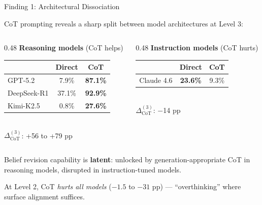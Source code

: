 \documentclass[aspectratio=169]{beamer}
\begin{document}
\begin{frame}{Finding 1: Architectural Dissociation}

\small
CoT prompting reveals a sharp split between model architectures at Level 3:

\vspace{0.3em}
\begin{columns}[T]
\begin{column}{0.48\textwidth}
\textbf{\textcolor{defabgreen}{Reasoning models}} (CoT helps)\\[3pt]
\footnotesize
\begin{tabular}{@{}lcc@{}}
\toprule
& Direct & CoT \\
\midrule
GPT-5.2 & 7.9\% & \textbf{87.1\%} \\
DeepSeek-R1 & 37.1\% & \textbf{92.9\%} \\
Kimi-K2.5 & 0.8\% & \textbf{27.6\%} \\
\bottomrule
\end{tabular}\\[4pt]
\small $\Delta_{\mathrm{CoT}}^{(3)}$: +56 to +79 pp
\end{column}

\begin{column}{0.48\textwidth}
\textbf{\textcolor{defabredish}{Instruction models}} (CoT hurts)\\[3pt]
\footnotesize
\begin{tabular}{@{}lcc@{}}
\toprule
& Direct & CoT \\
\midrule
Claude 4.6 & \textbf{23.6\%} & 9.3\% \\
\bottomrule
\end{tabular}\\[4pt]
\small $\Delta_{\mathrm{CoT}}^{(3)}$: $-$14 pp
\end{column}
\end{columns}

\vspace{0.5em}
Belief revision capability is \textbf{latent}: unlocked by generation-appropriate CoT in reasoning models, disrupted in instruction-tuned models.

\vspace{0.3em}
At Level 2, CoT \textit{hurts all models} ($-1.5$ to $-31$ pp) --- ``overthinking'' where surface alignment suffices.
\end{frame}
\end{document}
